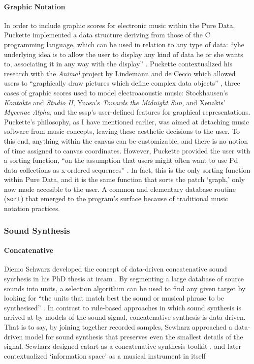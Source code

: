 \paragraph{Graphic Notation}
\label{graphic_scores}
In order to include graphic scores for electronic music within the Pure Data, Puckette implemented a data structure deriving from those of the C programming language, which can be used in relation to any type of data: ``yhe underlying idea is to allow the user to display any kind of data he or she wants to, associating it in any way with the display'' \parencite[184]{DBLP:conf/icmc/Puckette02}. Puckette contextualized his research with the \textit{Animal} project by Lindemann and de Cecco which allowed users to ``graphically draw pictures which define complex data objects'' \parencite{DBLP:conf/icmc/Lindemann90a}, three cases of graphic scores used to model electroacoustic music: Stockhausen's \textit{Kontakte} and \textit{Studio II}, Yuasa's \textit{Towards the Midnight Sun}, and Xenakis' \textit{Mycenae Alpha}, and the \gls{sssp}'s user-defined features for graphical representations. Puckette's philosophy, as I have mentioned earlier, was aimed at detaching music software from music concepts, leaving these aesthetic decisions to the user. To this end, anything within the canvas can be customizable, and there is no notion of time assigned to canvas coordinates. However, Puckette provided the user with a sorting function, ``on the assumption that users might often want to use Pd data collections as x-ordered sequences'' \parencite[185]{DBLP:conf/icmc/Puckette02}. In fact, this is the only sorting function within Pure Data, and it is the same function that sorts the patch `graph,' only now made accesible to the user. A common and elementary database routine (\texttt{sort}) that emerged to the program's surface because of traditional music notation practices.

\subsubsection{Sound Synthesis}
\label{applications:synthesis}

\paragraph{Concatenative}
Diemo Schwarz developed the concept of data-driven concatenative sound synthesis in his PhD thesis at \gls{ircam} \parencite{Schwarz2000, icmc/bbp2372.2003.099, Sch06:How}. By segmenting a large database of source sounds into units, a selection algorithim can be used to find any given target by looking for ``the units that match best the sound or musical phrase to be synthesised'' \parencite{Sch06:How}. In contrast to rule-based approaches in which sound synthesis is arrived at by models of the sound signal, concatenative synthesis is data-driven. That is to say, by joining together recorded samples, Scwharz approached a data-driven model for sound synthesis that preserves even the smallest details of the signal. Scwharz designed \gls{catart} as a concatenative synthesis toolkit \parencite{Sch06:Rea}, and later contextualized `information space' as a musical instrument in itself \parencite{Schwarz:2012}

